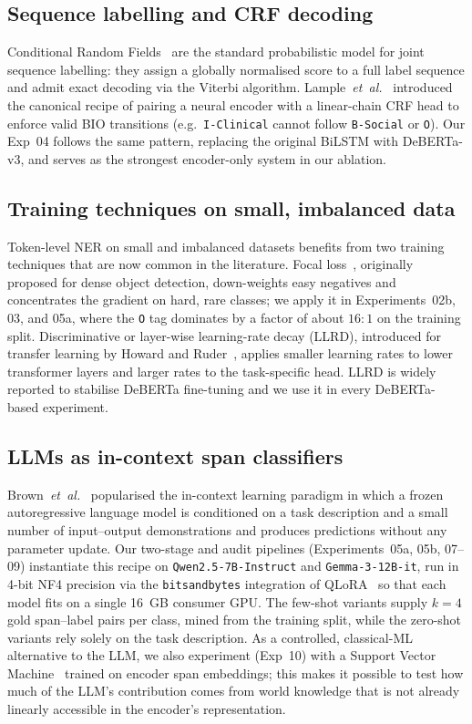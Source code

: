 \documentclass[journal]{IEEEtran}
\begin{document}
\subsection{Sequence labelling and CRF decoding}
Conditional Random Fields~\cite{lafferty2001crf} are the standard
probabilistic model for joint sequence labelling: they assign a
globally normalised score to a full label sequence and admit exact
decoding via the Viterbi algorithm.
Lample~\emph{et~al.}~\cite{lample2016neural} introduced the canonical
recipe of pairing a neural encoder with a linear-chain CRF head to
enforce valid BIO transitions (e.g.~\texttt{I-Clinical} cannot follow
\texttt{B-Social} or \texttt{O}). Our Exp~04 follows the same pattern,
replacing the original BiLSTM with DeBERTa-v3, and serves as the
strongest encoder-only system in our ablation.

\subsection{Training techniques on small, imbalanced data}
Token-level NER on small and imbalanced datasets benefits from two
training techniques that are now common in the literature. Focal
loss~\cite{lin2017focal}, originally proposed for dense object
detection, down-weights easy negatives and concentrates the gradient
on hard, rare classes; we apply it in Experiments~02b, 03, and 05a,
where the \texttt{O} tag dominates by a factor of about $16{:}1$ on
the training split.
Discriminative or layer-wise learning-rate decay (LLRD), introduced
for transfer learning by Howard and Ruder~\cite{howard2018ulmfit},
applies smaller learning rates to lower transformer layers and larger
rates to the task-specific head. LLRD is widely reported to stabilise
DeBERTa fine-tuning and we use it in every DeBERTa-based experiment.

\subsection{LLMs as in-context span classifiers}
Brown~\emph{et~al.}~\cite{brown2020fewshot} popularised the in-context
learning paradigm in which a frozen autoregressive language model is
conditioned on a task description and a small number of input--output
demonstrations and produces predictions without any parameter update.
Our two-stage and audit pipelines (Experiments~05a, 05b, 07--09)
instantiate this recipe on \texttt{Qwen2.5-7B-Instruct} and
\texttt{Gemma-3-12B-it}, run in 4-bit NF4 precision via the
\texttt{bitsandbytes} integration of QLoRA~\cite{dettmers2023qlora} so
that each model fits on a single 16~GB consumer GPU. The few-shot
variants supply $k{=}4$ gold span--label pairs per class, mined from
the training split, while the zero-shot variants rely solely on the
task description. As a controlled, classical-ML alternative to the
LLM, we also experiment (Exp~10) with a Support Vector
Machine~\cite{cortes1995svm} trained on encoder span embeddings; this
makes it possible to test how much of the LLM's contribution comes
from world knowledge that is not already linearly accessible in the
encoder's representation.
\end{document}
